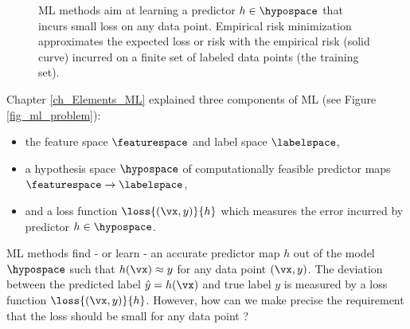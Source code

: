 \documentclass[12pt]{report}
\begin{document}
\begin{figure}[htbp]
\begin{center}
     \vspace*{-4mm}
\end{center}
\caption{ML methods aim at learning a predictor $h \in \hypospace$ that incurs 
	small loss on any data point. Empirical risk minimization approximates the
    expected loss or risk with the empirical risk (solid curve) incurred on a 
    finite set of labeled data points (the training set).}
\label{fig_ERM_idea}
\end{figure}


Chapter \ref{ch_Elements_ML} explained three components of ML (see Figure \ref{fig_ml_problem}): 
\begin{itemize} 
\item the feature space $\featurespace$ and label space $\labelspace$, 
\item a hypothesis space $\hypospace$ of computationally feasible predictor maps $\featurespace \rightarrow \labelspace$, 
\item and a loss function $\loss{(\vx,y)}{h}$ which measures the error incurred by predictor $h \in \hypospace$. 
\end{itemize} 
ML methods find - or learn - an accurate predictor map $h$ out 
of the model $\hypospace$ such that $h(\vx) \approx y$ for any 
data point $(\vx,y)$. The deviation between the predicted label $\hat{y}=h(\vx)$ 
and true label $y$ is measured by a loss function $\loss{(\vx,y)}{h}$. 
However, how can we make precise the requirement that the loss 
should be small for any data point ? 
\end{document}

